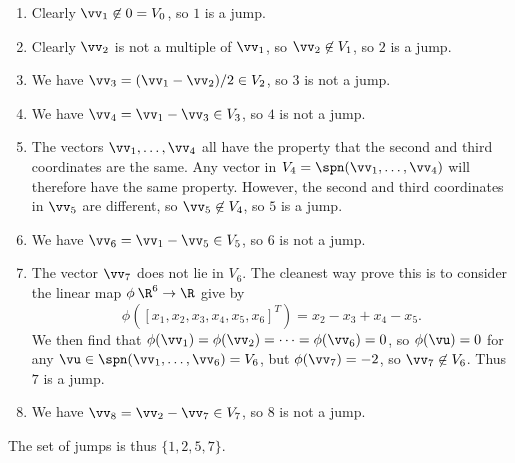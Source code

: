 \begin{solution}
 \begin{enumerate}
  \item Clearly $\vv_1\not\in 0=V_0$, so $1$ is a jump.
  \item Clearly $\vv_2$ is not a multiple of $\vv_1$, so
   $\vv_2\not\in V_1$, so $2$ is a jump.
  \item We have $\vv_3=(\vv_1-\vv_2)/2\in V_2$, so $3$ is
   not a jump.
  \item We have $\vv_4=\vv_1-\vv_3\in V_3$, so $4$ is not a jump.
  \item The vectors $\vv_1,\dotsc,\vv_4$ all have the
   property that the second and third coordinates are the
   same.  Any vector in $V_4=\spn(\vv_1,\dotsc,\vv_4)$ will
   therefore have the same property.  However, the second
   and third coordinates in $\vv_5$ are different, so
   $\vv_5\not\in V_4$, so $5$ is a jump.
  \item We have $\vv_6=\vv_1-\vv_5\in V_5$, so $6$ is not a jump.
  \item The vector $\vv_7$ does not lie in $V_6$.  The
   cleanest way  prove this is to consider the linear map
   $\phi\:\R^6\to\R$ give by
   \[ \phi([x_1,x_2,x_3,x_4,x_5,x_6]^T) =
       x_2-x_3+x_4-x_5.
   \]
   We then find that
   $\phi(\vv_1)=\phi(\vv_2)=\dotsb=\phi(\vv_6)=0$, so
   $\phi(\vu)=0$ for any
   $\vu\in\spn(\vv_1,\dotsc,\vv_6)=V_6$, but
   $\phi(\vv_7)=-2$, so $\vv_7\not\in V_6$.  Thus $7$ is a
   jump.
  \item We have $\vv_8=\vv_2-\vv_7\in V_7$, so $8$ is not a jump.
 \end{enumerate}
 The set of jumps is thus $\{1,2,5,7\}$.
\end{solution}





